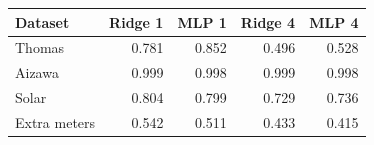 \begin{tabular}{lrrrr}
\toprule
Dataset & Ridge 1 & MLP 1 & Ridge 4 & MLP 4 \\
\midrule
Thomas & 0.781 & 0.852 & 0.496 & 0.528 \\
Aizawa & 0.999 & 0.998 & 0.999 & 0.998 \\
Solar & 0.804 & 0.799 & 0.729 & 0.736 \\
Extra meters & 0.542 & 0.511 & 0.433 & 0.415 \\
\bottomrule
\end{tabular}
